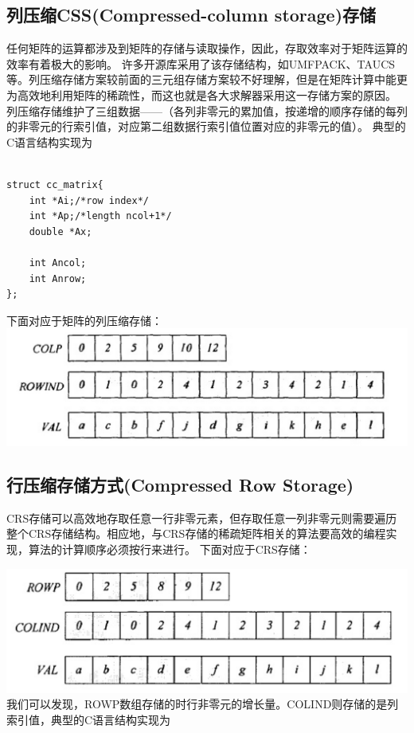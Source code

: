 \subsection{列压缩CSS(Compressed-column storage)存储}
任何矩阵的运算都涉及到矩阵的存储与读取操作，因此，存取效率对于矩阵运算的效率有着极大的影响。\newline
许多开源库采用了该存储结构，如UMFPACK、TAUCS等。列压缩存储方案较前面的三元组存储方案较不好理解，但是在矩阵计算中能更为高效地利用矩阵的稀疏性，而这也就是各大求解器采用这一存储方案的原因。\cite{fengguangxiang2010.}
\newline
列压缩存储维护了三组数据——（各列非零元的累加值，按递增的顺序存储的每列的非零元的行索引值，对应第二组数据行索引值位置对应的非零元的值）。
典型的C语言结构实现为\newline
\begin{lstlisting}

struct cc_matrix{ 
	int *Ai;/*row index*/ 
	int *Ap;/*length ncol+1*/
	double *Ax;
	
	int Ancol;
	int Anrow;
};

\end{lstlisting}
下面对应于矩阵的列压缩存储：
\newline\newline\newline\newline\newline
\includegraphics[scale=0.25]{ccmatrix.png}

\subsection{行压缩存储方式(Compressed Row Storage)}

CRS存储可以高效地存取任意一行非零元素，但存取任意一列非零元则需要遍历整个CRS存储结构。相应地，与CRS存储的稀疏矩阵相关的算法要高效的编程实现，算法的计算顺序必须按行来进行。\cite{fengguangxiang2010.}
下面对应于CRS存储：
\newline\newline\newline

\includegraphics[scale=0.25]{crs.png}
\newline\newline
我们可以发现，ROWP数组存储的时行非零元的增长量。COLIND则存储的是列索引值，典型的C语言结构实现为\newline

